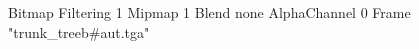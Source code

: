 {Bitmap
	{Filtering 1}
	{Mipmap 1}
	{Blend none}
	{AlphaChannel 0}
	{Frame "trunk_treeb#aut.tga"}
}
